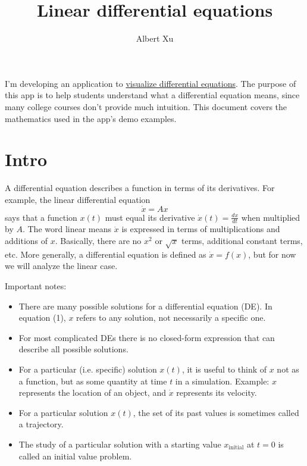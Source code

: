 \documentclass[11pt, oneside]{article}   	%
\title{Linear differential equations}
\author{Albert Xu}
\begin{document}
\maketitle

I'm developing an application to \href{https://github.com/alberttxu/diffeqvisualizer}{visualize differential equations}.
The purpose of this app is to help students understand what a differential equation means,
since many college courses don't provide much intuition.
This document covers the mathematics used in the app's demo examples.

\section{Intro}

A differential equation describes a function in terms of its derivatives.
For example, the linear differential equation
\begin{equation}
\dot{x} = Ax
\end{equation}
says that a function $x(t)$ must equal its derivative $\dot{x}(t) = \frac{dx}{dt}$ when multiplied by $A$.
The word linear means $\dot{x}$ is expressed in terms of multiplications and additions of $x$.
Basically, there are no $x^2$ or $\sqrt{x}$ terms, additional constant terms, etc.
More generally, a differential equation is defined as $\dot{x} = f(x)$,
but for now we will analyze the linear case.

Important notes:
\begin{itemize}
  \item There are many possible solutions for a differential equation (DE).
  In equation (1), $x$ refers to any solution, not necessarily a specific one.
  \item For most complicated DEs there is no closed-form expression that can describe all possible solutions.
  \item For a particular (i.e. specific) solution $x(t)$, it is useful to think of $x$ not as a function, but as some quantity at time $t$ in a simulation.
    \subitem Example: $x$ represents the location of an object, and $\dot{x}$ represents its velocity.
  \item For a particular solution $x(t)$, the set of its past values is sometimes called a trajectory.
  \item The study of a particular solution with a starting value $x_\mathrm{initial}$ at $t = 0$ is called an initial value problem.
\end{itemize}
\end{document}
